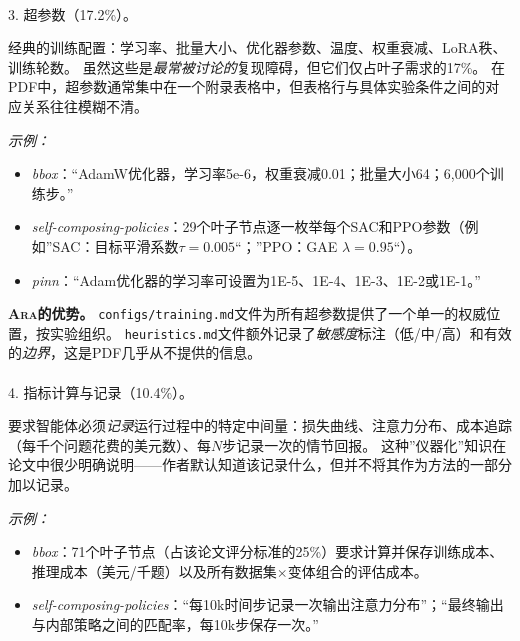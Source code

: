 \documentclass[
]{article}
\makeatletter
\let\oldparagraph\paragraph
\renewcommand{\paragraph}{
    \@ifstar
      \xxxParagraphStar
      \xxxParagraphNoStar
  }
\newcommand{\xxxParagraphStar}[1]{\oldparagraph*{#1}\mbox{}}
\newcommand{\xxxParagraphNoStar}[1]{\oldparagraph{#1}\mbox{}}
\newcommand{\passthrough}[1]{#1}
\providecommand{\tightlist}{%
  \setlength{\itemsep}{0pt}\setlength{\parskip}{0pt}}
\theoremstyle{definition}
\newcommand{\ara}{\textsc{Ara}}
\makeatother
\begin{document}
\paragraph{3. 超参数（17.2\%）。}\label{ux8d85ux53c2ux657017.2}

经典的训练配置：学习率、批量大小、优化器参数、温度、权重衰减、LoRA秩、训练轮数。
虽然这些是\emph{最常被讨论的}复现障碍，但它们仅占叶子需求的17\%。
在PDF中，超参数通常集中在一个附录表格中，但表格行与具体实验条件之间的对应关系往往模糊不清。

\emph{示例：}

\begin{itemize}
\tightlist
\item
  \emph{bbox}：``AdamW优化器，学习率5e-6，权重衰减0.01；批量大小64；6,000个训练步。''
\item
  \emph{self-composing-policies}：29个叶子节点逐一枚举每个SAC和PPO参数（例如''SAC：目标平滑系数\(\tau = 0.005\)``；''PPO：GAE
  \(\lambda = 0.95\)``）。
\item
  \emph{pinn}：``Adam优化器的学习率可设置为1E-5、1E-4、1E-3、1E-2或1E-1。''
\end{itemize}

\textbf{\ara{}的优势。}
\passthrough{\lstinline!configs/training.md!}文件为所有超参数提供了一个单一的权威位置，按实验组织。
\passthrough{\lstinline!heuristics.md!}文件额外记录了\emph{敏感度}标注（低/中/高）和有效的\emph{边界}，这是PDF几乎从不提供的信息。

\paragraph{4.
指标计算与记录（10.4\%）。}\label{ux6307ux6807ux8ba1ux7b97ux4e0eux8bb0ux5f5510.4}

要求智能体必须\emph{记录}运行过程中的特定中间量：损失曲线、注意力分布、成本追踪（每千个问题花费的美元数）、每\(N\)步记录一次的情节回报。
这种''仪器化''知识在论文中很少明确说明------作者默认知道该记录什么，但并不将其作为方法的一部分加以记录。

\emph{示例：}

\begin{itemize}
\tightlist
\item
  \emph{bbox}：71个叶子节点（占该论文评分标准的25\%）要求计算并保存训练成本、推理成本（美元/千题）以及所有数据集\(\times\)变体组合的评估成本。
\item
  \emph{self-composing-policies}：``每10k时间步记录一次输出注意力分布''；``最终输出与内部策略之间的匹配率，每10k步保存一次。''
\end{itemize}
\end{document}
